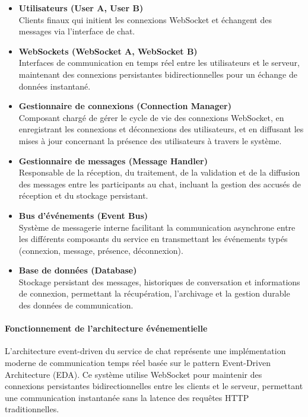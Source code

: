\documentclass[12pt]{rapportPfe}
\begin{document}
\begin{itemize}
    \item \textbf{Utilisateurs (User A, User B)} \\
    Clients finaux qui initient les connexions WebSocket et échangent des messages via l'interface de chat.
    
    \item \textbf{WebSockets (WebSocket A, WebSocket B)} \\
    Interfaces de communication en temps réel entre les utilisateurs et le serveur, maintenant des connexions persistantes bidirectionnelles pour un échange de données instantané.
    
    \item \textbf{Gestionnaire de connexions (Connection Manager)} \\
    Composant chargé de gérer le cycle de vie des connexions WebSocket, en enregistrant les connexions et déconnexions des utilisateurs, et en diffusant les mises à jour concernant la présence des utilisateurs à travers le système.
    
    \item \textbf{Gestionnaire de messages (Message Handler)} \\
    Responsable de la réception, du traitement, de la validation et de la diffusion des messages entre les participants au chat, incluant la gestion des accusés de réception et du stockage persistant.
    
    \item \textbf{Bus d'événements (Event Bus)} \\
    Système de messagerie interne facilitant la communication asynchrone entre les différents composants du service en transmettant les événements typés (connexion, message, présence, déconnexion).
    
    \item \textbf{Base de données (Database)} \\
    Stockage persistant des messages, historiques de conversation et informations de connexion, permettant la récupération, l'archivage et la gestion durable des données de communication.
\end{itemize}

\paragraph{Fonctionnement de l'architecture événementielle}

L'architecture event-driven du service de chat représente une implémentation moderne de communication temps réel basée sur le pattern Event-Driven Architecture (EDA). Ce système utilise WebSocket pour maintenir des connexions persistantes bidirectionnelles entre les clients et le serveur, permettant une communication instantanée sans la latence des requêtes HTTP traditionnelles. 
\end{document}
